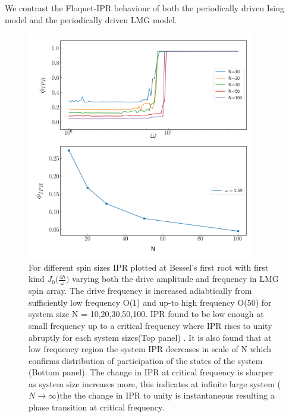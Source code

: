 \documentclass{article}
\begin{document}
We contrast the Floquet-IPR behaviour of both the periodically driven Ising model and the periodically driven LMG model. 

\begin{figure}[!ht]
\centering
\includegraphics[width = 10.0cm, height =10.0cm]{phase_transition_LMG_N.jpeg}
\caption{\color{blue} For different spin sizes IPR plotted at  Bessel's first root with first kind $J_0\Big(\frac{4h}{\omega}\Big)$ varying both the drive amplitude and frequency in LMG spin array. The drive frequency is increased adiabtically from sufficiently low frequency O(1) and  up-to high frequency O(50) for system size N = 10,20,30,50,100. IPR found to be low enough at small frequency up to a critical frequency where IPR rises to unity abruptly for each system sizes(Top panel) .  It is also found that at low frequency region the system IPR decreases in scale of N which confirms distribution of participation of the states of the system (Bottom panel). The change in IPR at critical frequency is sharper as system size increases more, this indicates at infinite large system ($N\xrightarrow{}\infty$)the the change in IPR to unity is instantaneous resulting  a phase transition at critical frequency.}
\end{figure}
\end{document}
